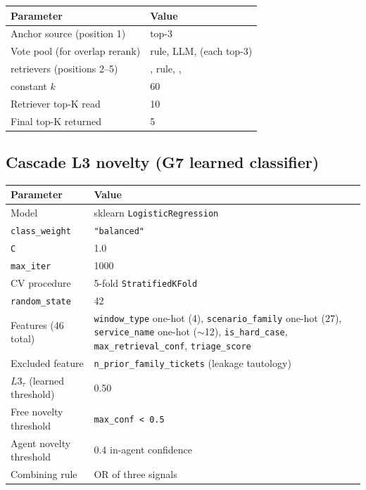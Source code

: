 \begin{table}[h]
\centering
\small
\begin{tabular}{ll}
\toprule
Parameter & Value \\
\midrule
Anchor source (position 1) & \bienc{} top-3 \\
Vote pool (for overlap rerank) & \hrrf{} rule, \hrrf{} LLM, \logseq{} (each top-3) \\
\rrf{} retrievers (positions 2--5) & \bienc{}, \hrrf{} rule, \logseq{}, \kgret{} \\
\rrf{} constant $k$ & 60 \\
Retriever top-K read & 10 \\
Final top-K returned & 5 \\
\bottomrule
\end{tabular}
\end{table}

\subsection{Cascade L3 novelty (G7 learned classifier)}

\begin{table}[h]
\centering
\small
\begin{tabular}{ll}
\toprule
Parameter & Value \\
\midrule
Model & sklearn \texttt{LogisticRegression} \\
\texttt{class\_weight} & \texttt{"balanced"} \\
\texttt{C} & 1.0 \\
\texttt{max\_iter} & 1000 \\
CV procedure & 5-fold \texttt{StratifiedKFold} \\
\texttt{random\_state} & 42 \\
Features (46 total) & \texttt{window\_type} one-hot (4), \texttt{scenario\_family} one-hot (27), \texttt{service\_name} one-hot ($\sim$12), \texttt{is\_hard\_case}, \texttt{max\_retrieval\_conf}, \texttt{triage\_score} \\
Excluded feature & \texttt{n\_prior\_family\_tickets} (leakage tautology) \\
$L3_{\tau}$ (learned threshold) & 0.50 \\
Free novelty threshold & \texttt{max\_conf < 0.5} \\
Agent novelty threshold & 0.4 in-agent confidence \\
Combining rule & OR of three signals \\
\bottomrule
\end{tabular}
\end{table}
